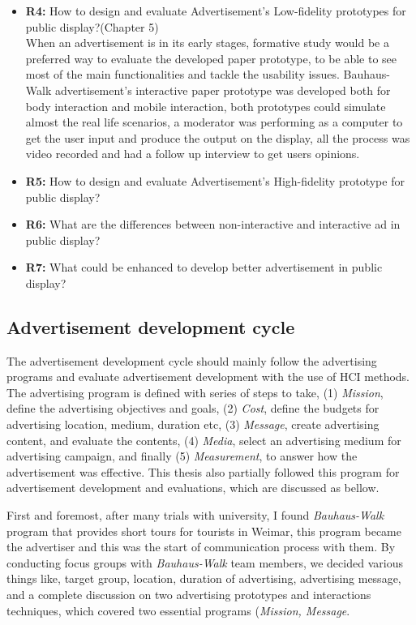 \begin{itemize}
\item \textbf{R4: }How to design and evaluate Advertisement's Low-fidelity prototypes for public display?(Chapter 5) \\
When an advertisement is in its early stages, formative study would be a preferred way to evaluate the developed paper prototype, to be able to see most of the main functionalities and tackle the usability issues. Bauhaus-Walk advertisement’s interactive paper prototype was developed both for body interaction and mobile interaction, both prototypes could simulate almost the real life scenarios, a moderator was performing as a computer to get the user input and produce the output on the display, all the process was video recorded and had a follow up interview to get users opinions. 


\item \textbf{R5: }How to design and evaluate Advertisement's High-fidelity prototype for public display?
\item \textbf{R6: }What are the differences between non-interactive and interactive ad in public display?
\item \textbf{R7: }What could be enhanced to develop better advertisement in public display? 

\end{itemize}
\fi

\subsection{Advertisement development cycle}
The advertisement development cycle should mainly follow the advertising programs\cite{ad_def} and evaluate advertisement development with the use of HCI methods. The advertising program is defined with series of steps to take, (1) \emph{Mission}, define the advertising objectives and goals, (2) \emph{Cost}, define the budgets for advertising location, medium, duration etc, (3) \emph{Message}, create advertising content, and evaluate the contents, (4) \emph{Media}, select an advertising medium for advertising campaign, and finally (5) \emph{Measurement}, to answer how the advertisement was effective. This thesis also partially followed this program for advertisement development and evaluations, which are discussed as bellow.


First and foremost, after many trials with university, I found \emph{Bauhaus-Walk} program that provides short tours for tourists in Weimar, this program became the advertiser and this was the start of communication process with them. By conducting focus groups with \emph{Bauhaus-Walk} team members, we decided various things like, target group, location, duration of advertising, advertising message, and a complete discussion on two advertising prototypes and interactions techniques, which covered two essential programs (\emph{Mission, Message}.

